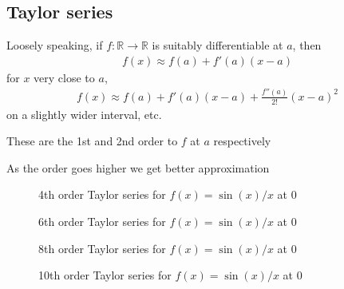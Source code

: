 \documentclass[letterpaper,10pt,english]{jupyterBook}
\begin{document}
\subsection{Taylor series}
\label{\detokenize{04.basic_analysis:taylor-series}}
\sphinxAtStartPar
Loosely speaking, if \(f \colon \mathbb{R} \to \mathbb{R}\) is suitably
differentiable at \(a\), then
\begin{equation*}
\begin{split}
f(x) \approx f(a) + f'(a)(x-a) 
\end{split}
\end{equation*}
\sphinxAtStartPar
for \(x\) very close to \(a\),
\begin{equation*}
\begin{split}
f(x) \approx f(a) + f'(a)(x-a) + \frac{f''(a)}{2!}(x-a)^2 
\end{split}
\end{equation*}
\sphinxAtStartPar
on a slightly wider interval, etc.

\sphinxAtStartPar
These are the 1st and 2nd order 
to \(f\) at \(a\) respectively

\sphinxAtStartPar
As the order goes higher we get better approximation

\begin{figure}[htbp]
\centering
\capstart

\noindent{}
\caption{4th order Taylor series for \(f(x) = \sin(x)/x\) at 0}\label{\detokenize{04.basic_analysis:taylor-4}}\end{figure}

\begin{figure}[htbp]
\centering
\capstart

\noindent{}
\caption{6th order Taylor series for \(f(x) = \sin(x)/x\) at 0}\label{\detokenize{04.basic_analysis:taylor-6}}\end{figure}

\begin{figure}[htbp]
\centering
\capstart

\noindent{}
\caption{8th order Taylor series for \(f(x) = \sin(x)/x\) at 0}\label{\detokenize{04.basic_analysis:taylor-8}}\end{figure}

\begin{figure}[htbp]
\centering
\capstart

\noindent{}
\caption{10th order Taylor series for \(f(x) = \sin(x)/x\) at 0}\label{\detokenize{04.basic_analysis:taylor-10}}\end{figure}
\end{document}
